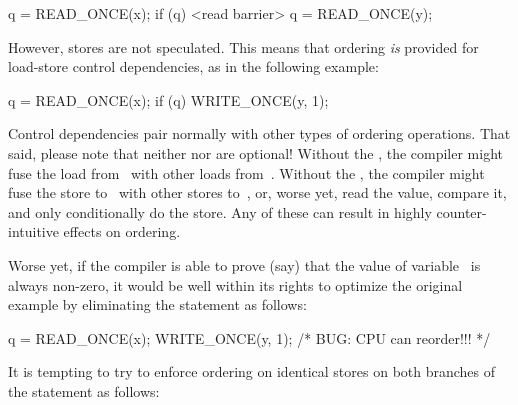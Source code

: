 \begin{VerbatimN}
q = READ_ONCE(x);
if (q) {
	<read barrier>
	q = READ_ONCE(y);
}
\end{VerbatimN}

However, stores are not speculated.
This means that ordering \emph{is} provided for load-store control
dependencies, as in the following example:

\begin{VerbatimN}
q = READ_ONCE(x);
if (q)
	WRITE_ONCE(y, 1);
\end{VerbatimN}

Control dependencies pair normally with other types of ordering operations.
That said, please note that neither  nor 
are optional!
Without the , the compiler might fuse the load
from~ with other loads from~.
Without the , the compiler might fuse the store
to~ with other stores to~, or, worse yet, read the
value, compare it, and only conditionally do the store.
Any of these can result in highly counter-intuitive effects on ordering.

Worse yet, if the compiler is able to prove (say) that the value of
variable~ is always non-zero, it would be well within its rights
to optimize the original example by eliminating the  statement
as follows:

\begin{VerbatimN}
q = READ_ONCE(x);
WRITE_ONCE(y, 1); /* BUG: CPU can reorder!!! */
\end{VerbatimN}

\QuickQuizEnd

It is tempting to try to enforce ordering on identical stores on both
branches of the  statement as follows:

